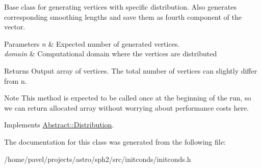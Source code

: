 Base class for generating vertices with specific distribution. Also generates corresponding smoothing lengths and save them as fourth component of the vector. 
\begin{DoxyParams}{Parameters}
{\em n} & Expected number of generated vertices. \\
\hline
{\em domain} & Computational domain where the vertices are distributed \\
\hline
\end{DoxyParams}
\begin{DoxyReturn}{Returns}
Output array of vertices. The total number of vertices can slightly differ from n. 
\end{DoxyReturn}
\begin{DoxyNote}{Note}
This method is expected to be called once at the beginning of the run, so we can return allocated array without worrying about performance costs here. 
\end{DoxyNote}


Implements \hyperlink{classAbstract_1_1Distribution_aefb835b4c4d2d0a5f864bc2cee0492b2}{Abstract\+::\+Distribution}.



The documentation for this class was generated from the following file\+:\begin{DoxyCompactItemize}
\item 
/home/pavel/projects/astro/sph2/src/initconds/initconds.\+h\end{DoxyCompactItemize}
